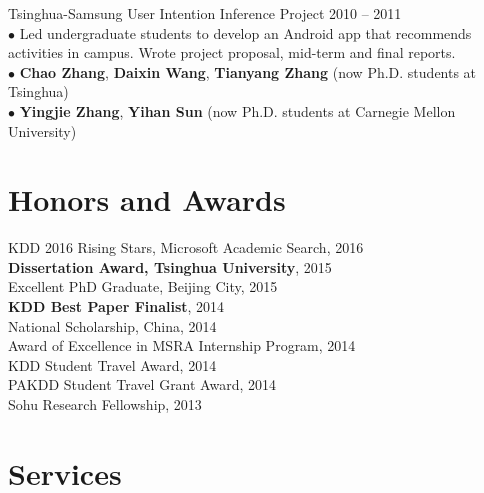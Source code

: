 \documentclass[margin, 10pt]{res}
\begin{document}
\begin{resume}
Tsinghua-Samsung User Intention Inference Project \hfill{2010 -- 2011} \\
$\bullet$ Led undergraduate students to develop an Android app that recommends activities in campus. Wrote project proposal, mid-term and final reports. \\
$\bullet$ \textbf{Chao Zhang}, \textbf{Daixin Wang}, \textbf{Tianyang Zhang} (now Ph.D. students at Tsinghua) \\
$\bullet$ \textbf{Yingjie Zhang}, \textbf{Yihan Sun} (now Ph.D. students at Carnegie Mellon University)


\section{Honors and Awards}

KDD 2016 Rising Stars, Microsoft Academic Search, 2016 \\
\textbf{Dissertation Award, Tsinghua University}, 2015 \\
{Excellent PhD Graduate, Beijing City}, 2015 \\
\textbf{KDD Best Paper Finalist}, 2014 \\
{National Scholarship, China}, 2014 \\
{Award of Excellence in MSRA Internship Program}, 2014 \\
{KDD Student Travel Award}, 2014 \\
{PAKDD Student Travel Grant Award}, 2014 \\
{Sohu Research Fellowship}, 2013


\section{Services}


\end{resume}
\end{document}
